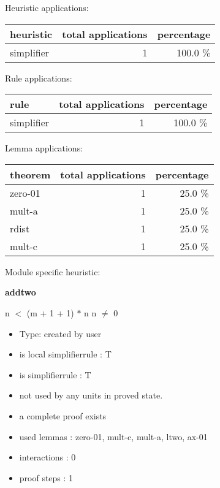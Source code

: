 \documentclass[a4paper]{article}
\begin{document}
\medskip


Heuristic applications:

\begin{supertabular}{l|r|r}
heuristic	& total applications & percentage \\ \hline
simplifier & 1 & 100.0 \% \\

\end{supertabular}

Rule applications:

\begin{supertabular}{l|r|r}
rule	        & total applications & percentage \\ \hline
simplifier & 1 & 100.0 \% \\

\end{supertabular}

Lemma applications:

\begin{supertabular}{l|r|r}
theorem	        & total applications & percentage \\ \hline
zero-01 & 1 & 25.0 \% \\
mult-a & 1 & 25.0 \% \\
rdist & 1 & 25.0 \% \\
mult-c & 1 & 25.0 \% \\

\end{supertabular}

Module specific heuristic:

\pagebreak

{\LARGE\bf addtwo}\label{lemma-addtwo}

\medskip

 \Fol n $<$ (m + 1 + 1) $*$ n \Equiv n $\neq$ 0

\begin{itemize}

\item Type: created by user

\item is local simplifierrule : T
\item is simplifierrule : T
\item not used by any units in proved state.
\item       a complete proof exists
\item       used lemmas  : zero-01, mult-c, mult-a, ltwo, ax-01
\item       interactions : 0
\item       proof steps  : 1
\end{itemize}
\end{document}
